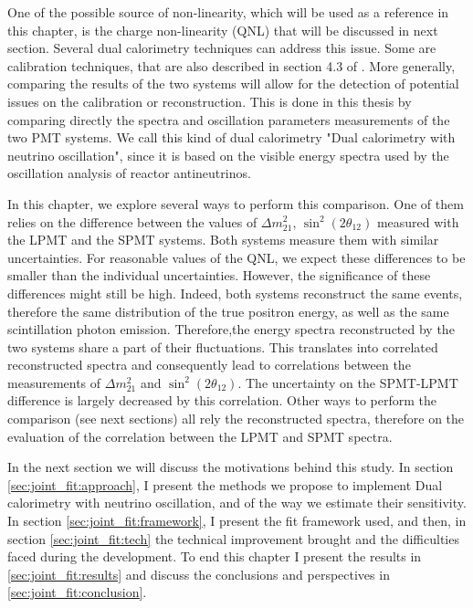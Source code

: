 \documentclass[../main.tex]{subfiles}
\begin{document}
One of the possible source of non-linearity, which will be used as a reference in this chapter, is the charge non-linearity (QNL) that will be discussed in next section.
Several dual calorimetry techniques can address this issue. Some are calibration techniques, that are also described in section 4.3 of \cite{han_dual_2021} .
More generally, comparing the results of the two systems will allow for the detection of potential issues on the calibration or reconstruction. This is done in this thesis by comparing directly the spectra and oscillation parameters measurements of the two PMT systems. We call this kind of dual calorimetry "Dual calorimetry with neutrino oscillation", since it is based on the visible energy spectra used by the oscillation analysis of reactor antineutrinos.

In this chapter, we explore several ways to perform this comparison. One of them relies on the difference between the values of $\Delta m^2_{21}$, $\sin^2(2\theta_{12})$ measured with the LPMT and the SPMT systems.
Both systems measure them with similar uncertainties. For reasonable values of the QNL, we expect these differences to be smaller than the individual uncertainties. However, the significance of these differences might still be high. Indeed, both systems reconstruct the same events, therefore the same distribution of the true positron energy, as well as the same scintillation photon emission. Therefore,the energy spectra reconstructed by the two systems share a part of their fluctuations. This translates into correlated reconstructed spectra and consequently lead to correlations between the measurements of $\Delta m^2_{21}$ and $\sin^2(2\theta_{12})$. The uncertainty on the SPMT-LPMT difference is largely decreased by this correlation.  Other ways to perform the comparison
(see next sections) all rely the reconstructed spectra, therefore on the evaluation of the correlation between the LPMT and SPMT spectra.

In the next section we will discuss the motivations behind this study. In section \ref{sec:joint_fit:approach},  I present the methods we propose to implement Dual calorimetry with neutrino oscillation, and of the way we estimate their sensitivity. In section \ref{sec:joint_fit:framework}, I present the fit framework used, and then, in section \ref{sec:joint_fit:tech} the technical improvement brought and the difficulties faced during the development. To end this chapter I present the results in \ref{sec:joint_fit:results} and discuss the conclusions and perspectives in \ref{sec:joint_fit:conclusion}.
\end{document}
